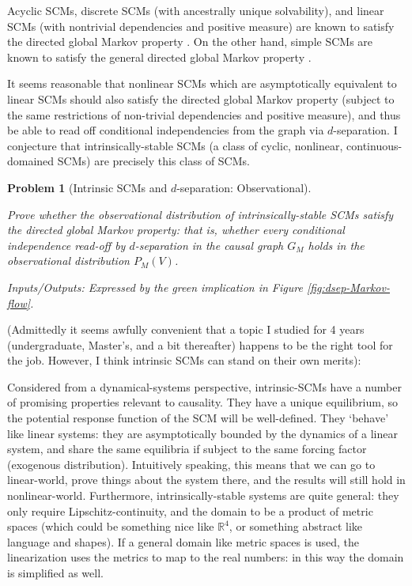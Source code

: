 \documentclass[letterpaper,10pt]{article}
\newtheorem{problem}{Problem}
\newcommand\R{\mathbb{R}}
\begin{document}
Acyclic SCMs, discrete SCMs (with ancestrally unique solvability), and linear SCMs (with nontrivial dependencies and positive measure) are known to satisfy the directed global Markov property \cite{MarkovCyclesLatent}. On the other hand, simple SCMs are known to satisfy the general directed global Markov property \cite{Foundations}. 

It seems reasonable that nonlinear SCMs which are asymptotically equivalent to linear SCMs should also satisfy the directed global Markov property (subject to the same restrictions of non-trivial dependencies and positive measure), and thus be able to read off conditional independencies from the graph via $d$-separation.
I conjecture that intrinsically-stable SCMs (a class of cyclic, nonlinear, continuous-domained SCMs) are precisely this class of SCMs.

\begin{problem}[Intrinsic SCMs and $d$-separation: Observational]
\label{prob:obs}

Prove whether the observational distribution of intrinsically-stable SCMs satisfy the directed global Markov property: that is, whether every conditional independence read-off by $d$-separation in the causal graph $G_M$ holds in the observational distribution $P_M(V)$.

Inputs/Outputs: Expressed by the green implication in Figure \ref{fig:dsep-Markov-flow}.
\end{problem}

(Admittedly it seems awfully convenient that a topic I studied for 4 years (undergraduate, Master's, and a bit thereafter) happens to be the right tool for the job. However, I think intrinsic SCMs can stand on their own merits):

Considered from a dynamical-systems perspective, intrinsic-SCMs have a number of promising properties relevant to causality. They have a unique equilibrium, so the potential response function of the SCM will be well-defined. They `behave’ like linear systems: they are asymptotically bounded by the dynamics of a linear system, and share the same equilibria if subject to the same forcing factor (exogenous distribution). Intuitively speaking, this means that we can go to linear-world, prove things about the system there, and the results will still hold in nonlinear-world. Furthermore, intrinsically-stable systems are quite general: they only require Lipschitz-continuity, and the domain to be a product of metric spaces (which could be something nice like $\R^4$, or something abstract like language and shapes). If a general domain like metric spaces is used, the linearization uses the metrics to map to the real numbers: in this way the domain is simplified as well.
\end{document}
